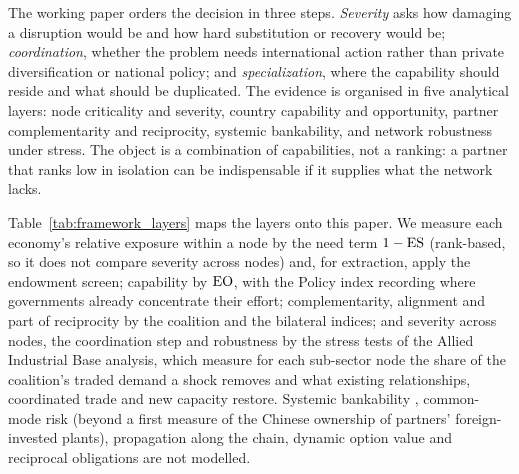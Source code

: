 The working paper orders the decision in three steps. \emph{Severity} asks how damaging a
disruption would be and how hard substitution or recovery would be; \emph{coordination}, whether
the problem needs international action rather than private diversification or national policy;
and \emph{specialization}, where the capability should reside and what should be duplicated. The
evidence is organised in five analytical layers: node criticality and severity, country
capability and opportunity, partner complementarity and reciprocity, systemic bankability, and
network robustness under stress. The object is a combination of capabilities, not a ranking: a
partner that ranks low in isolation can be indispensable if it supplies what the network lacks.

Table~\ref{tab:framework_layers} maps the layers onto this paper. We measure each economy's
relative exposure within a node by the need term $1-\mathrm{ES}$ (rank-based, so it does not compare
severity across nodes) and, for extraction, apply the endowment screen; capability by
$\mathrm{EO}$, with the Policy index recording where governments already concentrate their effort;
complementarity, alignment and part of reciprocity by the coalition and the bilateral indices;
and severity across nodes, the coordination step and robustness by the stress tests of the Allied
Industrial Base analysis, which measure for each sub-sector node the share of the coalition's traded
demand a shock removes and what existing relationships, coordinated trade and new capacity restore.
Systemic bankability \citep{spokas2025systemic}, common-mode risk (beyond a first measure of the
Chinese ownership of partners' foreign-invested plants), propagation along the chain, dynamic option
value and reciprocal obligations are not modelled.

